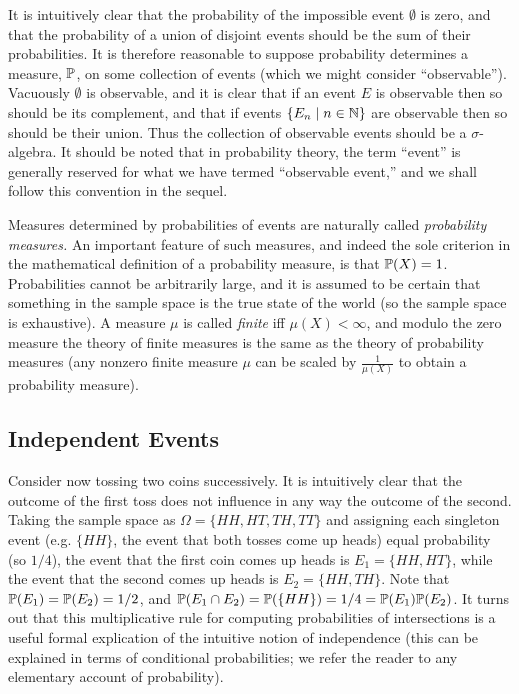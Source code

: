 \documentclass[leqno]{article}
\theoremstyle{definition}
\newcommand{\bldset}[2]{\{{#1}\mid{#2}\}}
\begin{document}
It is intuitively clear that the probability of the impossible event $\emptyset$ is zero, and that the probability of a union of disjoint events should be the sum of their probabilities. It is therefore reasonable to suppose probability determines a measure, $\P$, on some collection of events (which we might consider ``observable''). Vacuously $\emptyset$ is observable, and it is clear that if an event $E$ is observable then so should be its complement, and that if events $\bldset{E_n}{n \in \N}$ are observable then so should be their union. Thus the collection of observable events should be a $\sigma$-algebra. It should be noted that in probability theory, the term ``event'' is generally reserved for what we have termed ``observable event,'' and we shall follow this convention in the sequel.

Measures determined by probabilities of events are naturally called {\em probability measures.} An important feature of such measures, and indeed the sole criterion in the mathematical definition of a probability measure, is that $\P(X) = 1$. Probabilities cannot be arbitrarily large, and it is assumed to be certain that something in the sample space is the true state of the world (so the sample space is exhaustive). A measure $\mu$ is called {\em finite} iff $\mu(X) < \infty$, and modulo the zero measure the theory of finite measures is the same as the theory of probability measures (any nonzero finite measure $\mu$ can be scaled by $\frac{1}{\mu(X)}$ to obtain a probability measure).

\subsection{Independent Events}

Consider now tossing two coins successively. It is intuitively clear that the outcome of the first toss does not influence in any way the outcome of the second. Taking the sample space as $\Omega = \{HH, HT, TH, TT\}$ and assigning each singleton event (e.g. $\{HH\}$, the event that both tosses come up heads) equal probability (so $1/4$), the event that the first coin comes up heads is $E_1 = \{HH, HT\}$, while the event that the second comes up heads is $E_2 = \{HH, TH\}$. Note that $\P(E_1) = \P(E_2) = 1/2$, and $\P(E_1 \cap E_2) = \P(\{HH\}) = 1/4 = \P(E_1) \P(E_2)$. It turns out that this multiplicative rule for computing probabilities of intersections is a useful formal explication of the intuitive notion of independence (this can be explained in terms of conditional probabilities; we refer the reader to any elementary account of probability).
\end{document}
